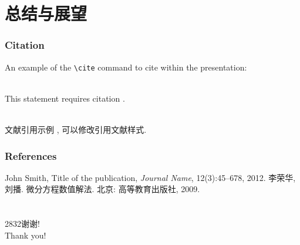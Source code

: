 \documentclass[noamsthm,notheorems,11pt,compress]{beamer}
\makeatletter
\numberwithin{figure}{section}
\numberwithin{table}{section}
\numberwithin{equation}{section}
\theoremstyle{plain} %
\newcommand\HUGE{\@setfontsize\Huge{28}{32}}
\makeatother
\begin{document}
\section{总结与展望}

\begin{frame}[fragile] %
\frametitle{Citation}
An example of the \verb|\cite| command to cite within the presentation:\\~

This statement requires citation \cite{Smith2012}. \\~

文献引用示例 \cite{LiLiu2009}, 可以修改引用文献样式.
\end{frame}



\begin{frame}
\frametitle{References}
\small
\begin{thebibliography}{99} %
 John Smith, Title of the publication, \emph{Journal Name}, 12(3):45--678, 2012.
 李荣华, 刘播. 微分方程数值解法. 北京: 高等教育出版社, 2009.
\end{thebibliography}

\end{frame}


\section{}


\begin{frame}
\begin{center}
\HUGE \textcolor[RGB]{165,3,3}{谢\quad 谢! \\[8pt]
Thank you!}
\end{center}
\end{frame}
\end{document}
